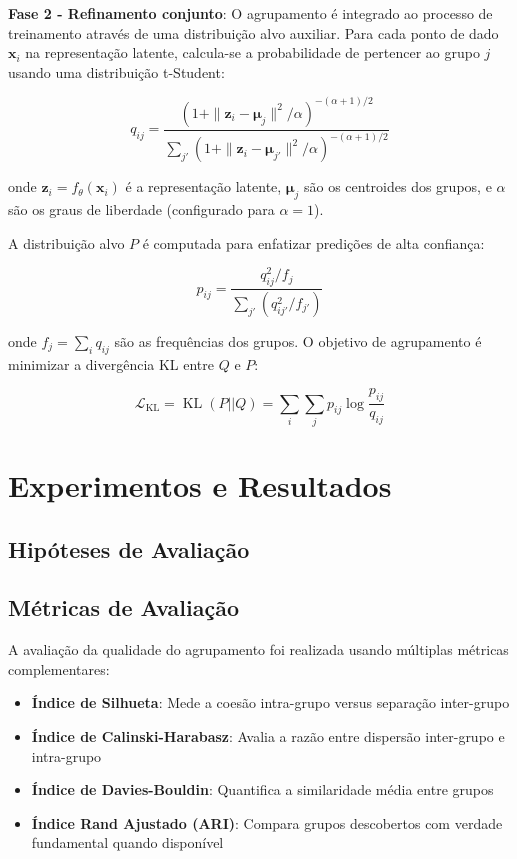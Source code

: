 \documentclass[12pt]{article}
\DeclareMathOperator{\KL}{KL}
\begin{document}
\textbf{Fase 2 - Refinamento conjunto}: O agrupamento é integrado ao processo de treinamento através de uma distribuição alvo auxiliar. Para cada ponto de dado $\mathbf{x}_i$ na representação latente, calcula-se a probabilidade de pertencer ao grupo $j$ usando uma distribuição t-Student:

\begin{equation}
q_{ij} = \frac{(1 + \|\mathbf{z}_i - \boldsymbol{\mu}_j\|^2/\alpha)^{-(\alpha+1)/2}}{\sum_{j'}(1 + \|\mathbf{z}_i - \boldsymbol{\mu}_{j'}\|^2/\alpha)^{-(\alpha+1)/2}}
\end{equation}

onde $\mathbf{z}_i = f_\theta(\mathbf{x}_i)$ é a representação latente, $\boldsymbol{\mu}_j$ são os centroides dos grupos, e $\alpha$ são os graus de liberdade (configurado para $\alpha=1$).

A distribuição alvo $P$ é computada para enfatizar predições de alta confiança:

\begin{equation}
p_{ij} = \frac{q_{ij}^2/f_j}{\sum_{j'}(q_{ij'}^2/f_{j'})}
\end{equation}

onde $f_j = \sum_i q_{ij}$ são as frequências dos grupos. O objetivo de agrupamento é minimizar a divergência KL entre $Q$ e $P$:

\begin{equation}
\mathcal{L}_{\KL} = \KL(P||Q) = \sum_i \sum_j p_{ij} \log\frac{p_{ij}}{q_{ij}}
\end{equation}

\section{Experimentos e Resultados}

\subsection{Hipóteses de Avaliação}

\subsection{Métricas de Avaliação}

A avaliação da qualidade do agrupamento foi realizada usando múltiplas métricas complementares:

\begin{itemize}
    \item \textbf{Índice de Silhueta}: Mede a coesão intra-grupo versus separação inter-grupo
    \item \textbf{Índice de Calinski-Harabasz}: Avalia a razão entre dispersão inter-grupo e intra-grupo
    \item \textbf{Índice de Davies-Bouldin}: Quantifica a similaridade média entre grupos
    \item \textbf{Índice Rand Ajustado (ARI)}: Compara grupos descobertos com verdade fundamental quando disponível
\end{itemize}
\end{document}
